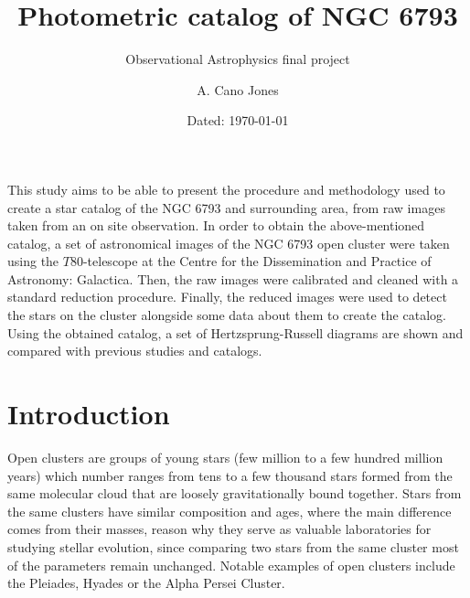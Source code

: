 \documentclass{aa}
\begin{document}
 


   \title{Photometric catalog of NGC 6793}

   \subtitle{Observational Astrophysics final project}

   \author{A. Cano Jones }


   \date{Dated: \today}
 
  \abstract
   {}
   {This study aims to be able to present the procedure and methodology used to create a star catalog of the NGC 6793 and surrounding area, from raw images taken from an on site observation.}
   {In order to obtain the above-mentioned catalog, a set of astronomical images of the NGC 6793 open cluster were taken using the $T80$-telescope at the Centre for the Dissemination and Practice of Astronomy: Galactica. Then, the raw images were calibrated and cleaned with a standard reduction procedure. Finally, the reduced images were used to detect the stars on the cluster alongside some data about them to create the catalog.}
   {Using the obtained catalog, a set of Hertzsprung-Russell diagrams are shown and compared with previous studies and catalogs.}
   {}
   


   \maketitle
    \section{Introduction}\label{sec: Introduction}
    Open clusters are groups of young stars (few million to a few hundred million years) which number ranges from tens to a few thousand stars formed from the same molecular cloud that are loosely  gravitationally bound together. 
    Stars from the same clusters have similar composition and ages, where the main difference comes from their masses, reason why they serve as valuable laboratories for studying stellar evolution, since comparing two stars from the same cluster most of the parameters remain unchanged. Notable examples of open clusters include the Pleiades, Hyades or the Alpha Persei Cluster.
\end{document}
